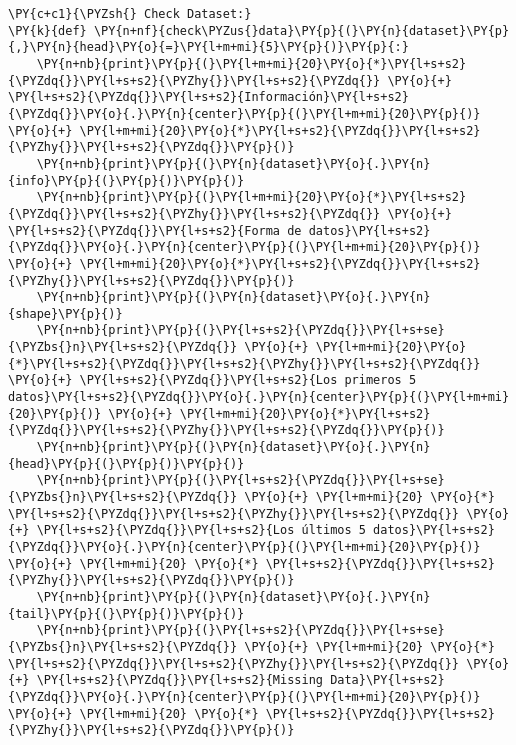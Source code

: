     \begin{tcolorbox}[breakable, size=fbox, boxrule=1pt, pad at break*=1mm,colback=cellbackground, colframe=cellborder]
\begin{Verbatim}[commandchars=\\\{\}]
\PY{c+c1}{\PYZsh{} Check Dataset:}
\PY{k}{def} \PY{n+nf}{check\PYZus{}data}\PY{p}{(}\PY{n}{dataset}\PY{p}{,}\PY{n}{head}\PY{o}{=}\PY{l+m+mi}{5}\PY{p}{)}\PY{p}{:}
    \PY{n+nb}{print}\PY{p}{(}\PY{l+m+mi}{20}\PY{o}{*}\PY{l+s+s2}{\PYZdq{}}\PY{l+s+s2}{\PYZhy{}}\PY{l+s+s2}{\PYZdq{}} \PY{o}{+} \PY{l+s+s2}{\PYZdq{}}\PY{l+s+s2}{Información}\PY{l+s+s2}{\PYZdq{}}\PY{o}{.}\PY{n}{center}\PY{p}{(}\PY{l+m+mi}{20}\PY{p}{)} \PY{o}{+} \PY{l+m+mi}{20}\PY{o}{*}\PY{l+s+s2}{\PYZdq{}}\PY{l+s+s2}{\PYZhy{}}\PY{l+s+s2}{\PYZdq{}}\PY{p}{)}
    \PY{n+nb}{print}\PY{p}{(}\PY{n}{dataset}\PY{o}{.}\PY{n}{info}\PY{p}{(}\PY{p}{)}\PY{p}{)}
    \PY{n+nb}{print}\PY{p}{(}\PY{l+m+mi}{20}\PY{o}{*}\PY{l+s+s2}{\PYZdq{}}\PY{l+s+s2}{\PYZhy{}}\PY{l+s+s2}{\PYZdq{}} \PY{o}{+} \PY{l+s+s2}{\PYZdq{}}\PY{l+s+s2}{Forma de datos}\PY{l+s+s2}{\PYZdq{}}\PY{o}{.}\PY{n}{center}\PY{p}{(}\PY{l+m+mi}{20}\PY{p}{)} \PY{o}{+} \PY{l+m+mi}{20}\PY{o}{*}\PY{l+s+s2}{\PYZdq{}}\PY{l+s+s2}{\PYZhy{}}\PY{l+s+s2}{\PYZdq{}}\PY{p}{)}
    \PY{n+nb}{print}\PY{p}{(}\PY{n}{dataset}\PY{o}{.}\PY{n}{shape}\PY{p}{)}
    \PY{n+nb}{print}\PY{p}{(}\PY{l+s+s2}{\PYZdq{}}\PY{l+s+se}{\PYZbs{}n}\PY{l+s+s2}{\PYZdq{}} \PY{o}{+} \PY{l+m+mi}{20}\PY{o}{*}\PY{l+s+s2}{\PYZdq{}}\PY{l+s+s2}{\PYZhy{}}\PY{l+s+s2}{\PYZdq{}} \PY{o}{+} \PY{l+s+s2}{\PYZdq{}}\PY{l+s+s2}{Los primeros 5 datos}\PY{l+s+s2}{\PYZdq{}}\PY{o}{.}\PY{n}{center}\PY{p}{(}\PY{l+m+mi}{20}\PY{p}{)} \PY{o}{+} \PY{l+m+mi}{20}\PY{o}{*}\PY{l+s+s2}{\PYZdq{}}\PY{l+s+s2}{\PYZhy{}}\PY{l+s+s2}{\PYZdq{}}\PY{p}{)}
    \PY{n+nb}{print}\PY{p}{(}\PY{n}{dataset}\PY{o}{.}\PY{n}{head}\PY{p}{(}\PY{p}{)}\PY{p}{)}
    \PY{n+nb}{print}\PY{p}{(}\PY{l+s+s2}{\PYZdq{}}\PY{l+s+se}{\PYZbs{}n}\PY{l+s+s2}{\PYZdq{}} \PY{o}{+} \PY{l+m+mi}{20} \PY{o}{*} \PY{l+s+s2}{\PYZdq{}}\PY{l+s+s2}{\PYZhy{}}\PY{l+s+s2}{\PYZdq{}} \PY{o}{+} \PY{l+s+s2}{\PYZdq{}}\PY{l+s+s2}{Los últimos 5 datos}\PY{l+s+s2}{\PYZdq{}}\PY{o}{.}\PY{n}{center}\PY{p}{(}\PY{l+m+mi}{20}\PY{p}{)} \PY{o}{+} \PY{l+m+mi}{20} \PY{o}{*} \PY{l+s+s2}{\PYZdq{}}\PY{l+s+s2}{\PYZhy{}}\PY{l+s+s2}{\PYZdq{}}\PY{p}{)}
    \PY{n+nb}{print}\PY{p}{(}\PY{n}{dataset}\PY{o}{.}\PY{n}{tail}\PY{p}{(}\PY{p}{)}\PY{p}{)}
    \PY{n+nb}{print}\PY{p}{(}\PY{l+s+s2}{\PYZdq{}}\PY{l+s+se}{\PYZbs{}n}\PY{l+s+s2}{\PYZdq{}} \PY{o}{+} \PY{l+m+mi}{20} \PY{o}{*} \PY{l+s+s2}{\PYZdq{}}\PY{l+s+s2}{\PYZhy{}}\PY{l+s+s2}{\PYZdq{}} \PY{o}{+} \PY{l+s+s2}{\PYZdq{}}\PY{l+s+s2}{Missing Data}\PY{l+s+s2}{\PYZdq{}}\PY{o}{.}\PY{n}{center}\PY{p}{(}\PY{l+m+mi}{20}\PY{p}{)} \PY{o}{+} \PY{l+m+mi}{20} \PY{o}{*} \PY{l+s+s2}{\PYZdq{}}\PY{l+s+s2}{\PYZhy{}}\PY{l+s+s2}{\PYZdq{}}\PY{p}{)}

\end{Verbatim}
\end{tcolorbox}

